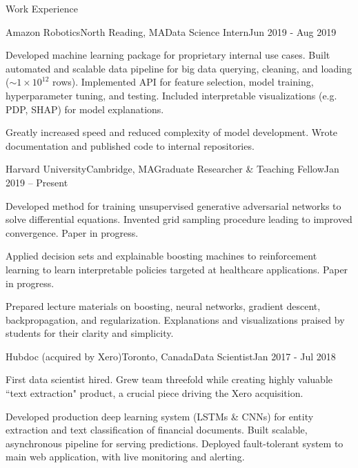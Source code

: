 \documentclass{resume} %
\begin{document}
\begin{rSection}{Work Experience}

\begin{rSubsection}{Amazon Robotics}{North Reading, MA}{Data Science Intern}{Jun 2019 - Aug 2019}
\item
    Developed machine learning package for proprietary internal use cases.
    Built automated and scalable data pipeline for big data querying, cleaning, and loading ($\sim 1 \times 10^{12}$ rows).
    Implemented API for feature selection, model training, hyperparameter tuning, and testing.
    Included interpretable visualizations (e.g. PDP, SHAP) for model explanations.

\item
    Greatly increased speed and reduced complexity of model development.
    Wrote documentation and published code to internal repositories.
\end{rSubsection}


\begin{rSubsection}{Harvard University}{Cambridge, MA}{Graduate Researcher \& Teaching Fellow}{Jan 2019 -- Present}
\item
    Developed method for training unsupervised generative adversarial networks to solve differential equations.
    Invented grid sampling procedure leading to improved convergence. Paper in progress.
\item
    Applied decision sets and explainable boosting machines to reinforcement learning to learn interpretable policies targeted at healthcare applications. Paper in progress.
\item
    Prepared lecture materials on boosting, neural networks, gradient descent, backpropagation, and regularization.
    Explanations and visualizations praised by students for their clarity and simplicity.
\end{rSubsection}


\begin{rSubsection}{Hubdoc (acquired by Xero)}{Toronto, Canada}{Data Scientist}{Jan 2017 - Jul 2018}
\item
    First data scientist hired.
    Grew team threefold while creating highly valuable ``text extraction" product, a crucial piece driving the Xero acquisition.

\item
    Developed production deep learning system (LSTMs \& CNNs) for entity extraction and text classification of financial documents.
    Built scalable, asynchronous pipeline for serving predictions.
    Deployed fault-tolerant system to main web application, with live monitoring and alerting.


\end{rSubsection}
\end{rSection}
\end{document}
